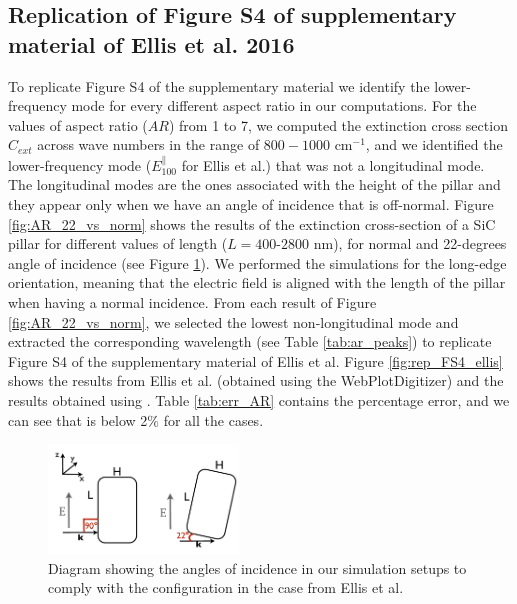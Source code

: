 \subsection{Replication of Figure S4 of supplementary material of Ellis et al. 2016}

To replicate Figure S4 of the supplementary material we identify the lower-frequency mode for every different 
aspect ratio in our computations. For the values of aspect ratio ($AR$) from 1 to 7, we computed the extinction cross section 
$C_{ext}$ across wave numbers in the range of $800-1000$ cm$^{-1}$, and we identified the lower-frequency mode 
($E^{\parallel}_{100}$ for Ellis et al.) that was not a longitudinal mode. The longitudinal modes are the ones associated with 
the height of the pillar and they appear only when we have an angle of incidence that is off-normal. 
Figure \ref{fig:AR_22_vs_norm} shows the results of the extinction cross-section of a SiC pillar for different values of 
length ($L=400$-$2800$ nm), for normal and 22-degrees angle of incidence (see Figure \ref{fig:ellis_ang_inc}). We performed 
the simulations for the long-edge orientation, meaning that the electric field is aligned with the length of the pillar when having a normal 
incidence. From each result of Figure \ref{fig:AR_22_vs_norm}, we selected the lowest non-longitudinal mode and extracted the corresponding wavelength
(see Table \ref{tab:ar_peaks}) to replicate Figure S4 of the supplementary material of Ellis et al. Figure \ref{fig:rep_FS4_ellis} shows the
results from Ellis et al. (obtained using the WebPlotDigitizer) and the results obtained using \pygbe. Table \ref{tab:err_AR} contains the 
percentage error, and we can see that is below 2$\%$ for all the cases.

\begin{figure}
    \centering
    \includegraphics[width=0.45\textwidth]{ellis_ang_inc.pdf} 
    \caption{Diagram showing the angles of incidence in our simulation setups to comply with the configuration in the case from Ellis et al.}
    \label{fig:ellis_ang_inc}
\end{figure}

